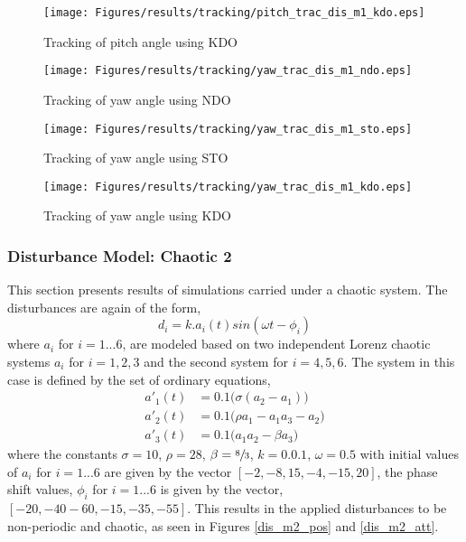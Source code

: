 \documentclass{article}
\begin{document}
\begin{figure}[H]
\centering
\texttt{[image: Figures/results/tracking/pitch\_trac\_dis\_m1\_kdo.eps]}
\caption{Tracking of pitch angle using KDO}
\label{pitch_trac_dis_m1_kdo}
\end{figure}

\begin{figure}[H]
\centering
\texttt{[image: Figures/results/tracking/yaw\_trac\_dis\_m1\_ndo.eps]}
\caption{Tracking of yaw angle using NDO}
\label{yaw_trac_dis_m1_ndo}
\end{figure}

\begin{figure}[H]
\centering
\texttt{[image: Figures/results/tracking/yaw\_trac\_dis\_m1\_sto.eps]}
\caption{Tracking of yaw angle using STO}
\label{yaw_trac_dis_m1_sto}
\end{figure}

\begin{figure}[H]
\centering
\texttt{[image: Figures/results/tracking/yaw\_trac\_dis\_m1\_kdo.eps]}
\caption{Tracking of yaw angle using KDO}
\label{yaw_trac_dis_m1_kdo}
\end{figure}

\subsubsection{Disturbance Model: Chaotic 2}
This section presents results of simulations carried under a chaotic system. The disturbances are again of the form,
\begin{equation}
d_i = k.a_i(t)sin(\omega t-\phi_i)
\end{equation}
where $a_i$ for $i=1...6$, are modeled based on two independent Lorenz chaotic systems $a_i$ for $i=1,2,3$ and the second system for $i=4,5,6$. The system in this case is defined by the set of ordinary equations, 
\begin{subequations}
\begin{align}
a'_1(t) &= 0.1\big(\sigma(a_2-a_1)\big)\\
a'_2(t) &= 0.1\big(\rho a_1 - a_1 a_3 - a_2\big)\\
a'_3(t) &= 0.1\big(a_1 a_2 - \beta a_3\big)
\end{align}
\end{subequations}
where the constants $\sigma=10$, $\rho=28$, $\beta=\sfrac{8}{3}$, $k=0.0.1$, $\omega=0.5$ with initial values of $a_i$ for $i=1...6$ are given by the vector $[-2,-8,15,-4,-15,20]$, the phase shift values, $\phi_i$ for $i=1...6$ is given by the vector, $[-20,-40-60,-15,-35,-55]$. This results in the applied disturbances to be non-periodic and chaotic, as seen in Figures \ref{dis_m2_pos} and \ref{dis_m2_att}.
\end{document}
